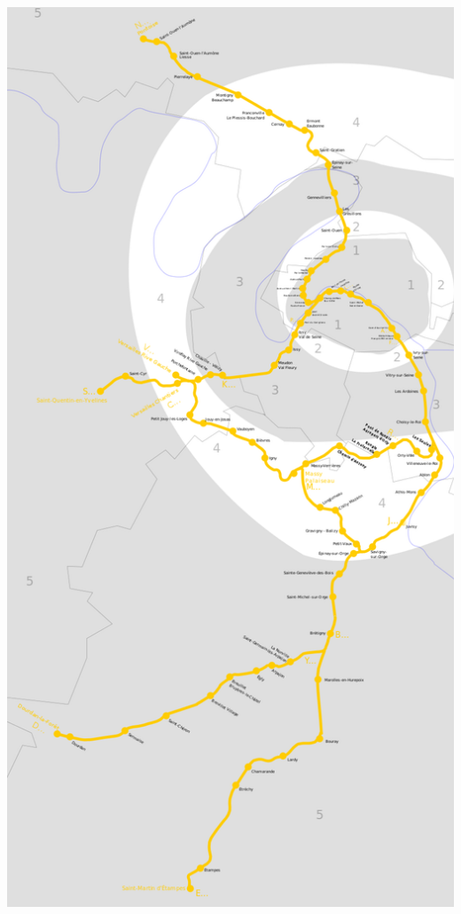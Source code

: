 \documentclass[table]{beamer}
\begin{document}
\begin{frame}
\begin{columns}
\begin{column}{0.3\linewidth}
      \includegraphics[width=\linewidth]{images/rer-c-map}      
    \end{column}
  \end{columns}
\end{frame}

\begin{frame}
  \titlepage
\end{frame}
\end{document}
